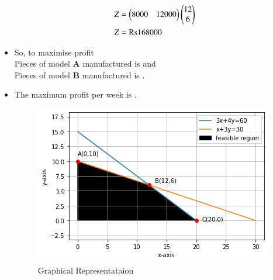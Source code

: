 \documentclass[journal,12pt,twocolumn]{IEEEtran}
\begin{document}
\begin{itemize}
\begin{align}
   Z &= \begin{pmatrix}8000&12000\end{pmatrix}\begin{pmatrix}12 \\ 6\end{pmatrix} \\
    Z&= \text{Rs} 168000
\end{align}
\item So, to maximise profit
\\
 Pieces of model \textbf{A} manufactured is  and
 \\
  Pieces of model \textbf{B} manufactured is .
\item The maximum profit per week is  .
\begin{figure}[!ht]
\centering
\includegraphics[width=\columnwidth]{Figure 10_1.png}
\caption{Graphical Representataion}
\end{figure}
\end{itemize}
\end{document}
